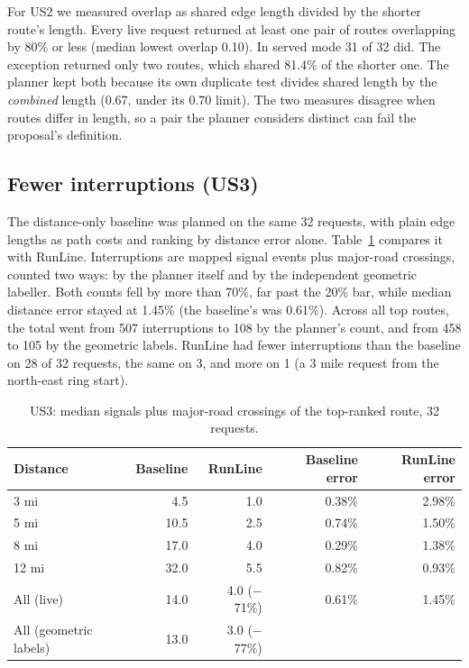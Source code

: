 For US2 we measured overlap as shared edge length divided by the shorter
route's length. Every live request returned at least one pair of routes
overlapping by 80\% or less (median lowest overlap 0.10). In served mode
31 of 32 did. The exception returned only two routes, which shared 81.4\% of
the shorter one. The planner kept both because its own duplicate test
divides shared length by the \emph{combined} length (0.67, under its 0.70
limit). The two measures disagree when routes differ in length, so a pair
the planner considers distinct can fail the proposal's definition.

\subsection{Fewer interruptions (US3)}
The distance-only baseline was planned on the same 32 requests, with plain
edge lengths as path costs and ranking by distance error alone.
Table~\ref{tab:us3} compares it with RunLine. Interruptions are mapped signal
events plus major-road crossings, counted two ways: by the planner itself
and by the independent geometric labeller. Both counts fell by more than
70\%, far past the 20\% bar, while median distance error stayed at 1.45\%
(the baseline's was 0.61\%). Across all top routes, the total went from 507
interruptions to 108 by the planner's count, and from 458 to 105 by the
geometric labels. RunLine had fewer interruptions than the baseline on 28 of
32 requests, the same on 3, and more on 1 (a 3 mile request from the
north-east ring start).

\begin{table}[ht]
\centering\small
\caption{US3: median signals plus major-road crossings of the top-ranked route, 32 requests.}
\label{tab:us3}
\begin{tabular}{@{}l r r r r@{}}
\toprule
Distance & Baseline & RunLine & Baseline error & RunLine error \\
\midrule
3 mi & 4.5 & 1.0 & 0.38\% & 2.98\% \\
5 mi & 10.5 & 2.5 & 0.74\% & 1.50\% \\
8 mi & 17.0 & 4.0 & 0.29\% & 1.38\% \\
12 mi & 32.0 & 5.5 & 0.82\% & 0.93\% \\
\midrule
All (live) & 14.0 & 4.0 ($-$71\%) & 0.61\% & 1.45\% \\
All (geometric labels) & 13.0 & 3.0 ($-$77\%) & & \\
\bottomrule
\end{tabular}
\end{table}

